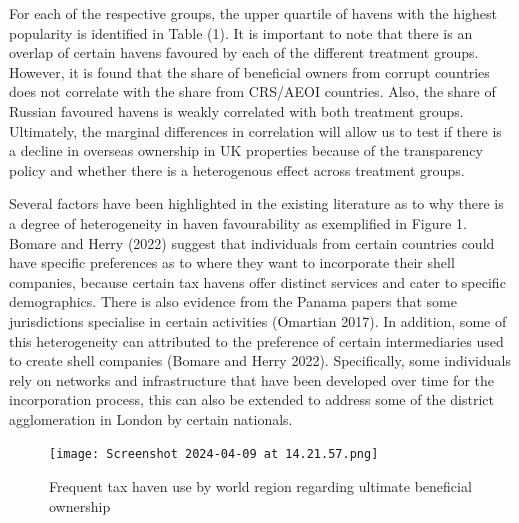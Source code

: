 \documentclass{article}
\begin{document}
For each of the respective groups, the upper quartile of havens with the highest popularity is identified in Table (1). It is important to note that there is an overlap of certain havens favoured by each of the different treatment groups. However, it is found that the share of beneficial owners from corrupt countries does not correlate with the share from CRS/AEOI countries. Also, the share of Russian favoured havens is weakly correlated with both treatment groups. Ultimately, the marginal differences in correlation will allow us to test if there is a decline in overseas ownership in UK properties because of the transparency policy and whether there is a heterogenous effect across treatment groups. 

Several factors have been highlighted in the existing literature as to why there is a degree of heterogeneity in haven favourability as exemplified in Figure 1. Bomare and Herry (2022) suggest that individuals from certain countries could have specific preferences as to where they want to incorporate their shell companies, because certain tax havens offer distinct services and cater to specific demographics. There is also evidence from the Panama papers that some jurisdictions specialise in certain activities (Omartian 2017). In addition, some of this heterogeneity can attributed to the preference of certain intermediaries used to create shell companies (Bomare and Herry 2022). Specifically, some individuals rely on networks and infrastructure that have been developed over time for the incorporation process, this can also be extended to address some of the district agglomeration in London by certain nationals.

\begin{figure}[H]
    \centering
    \texttt{[image: Screenshot 2024-04-09 at 14.21.57.png]}
    \caption{Frequent tax haven use by world region regarding ultimate beneficial ownership\protect\footnotemark}
    \label{fig:unique-label}
\end{figure}

\addtocounter{footnote}{0} %
\end{document}
